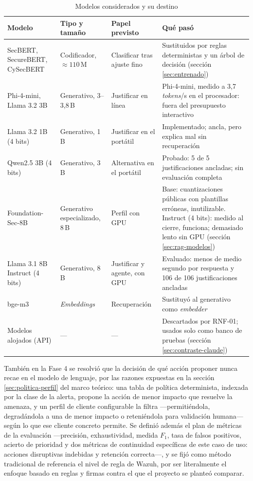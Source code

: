 \begin{table}[H]
  \centering
  \caption{Modelos considerados y su destino}
  \label{tab:candidatos}
  \begin{tabular}{@{}p{}p{}p{}p{}@{}}
    \toprule
    \textbf{Modelo} & \textbf{Tipo y tamaño} & \textbf{Papel previsto} & \textbf{Qué pasó} \\
    \midrule
    SecBERT, SecureBERT, CySecBERT & Codificador, $\approx 110$\,M & Clasificar tras ajuste fino & Sustituidos por reglas deterministas y un árbol de decisión (sección \ref{sec:entrenado}) \\
    Phi-4-mini, Llama 3.2 3B & Generativo, 3--3,8\,B & Justificar en línea & Phi-4-mini, medido a 3,7 \emph{tokens}/s en el procesador: fuera del presupuesto interactivo \\
    Llama 3.2 1B (4 bits) & Generativo, 1\,B & Justificar en el portátil & Implementado; ancla, pero explica mal sin recuperación \\
    Qwen2.5 3B (4 bits) & Generativo, 3\,B & Alternativa en el portátil & Probado: 5 de 5 justificaciones ancladas; sin evaluación completa \\
    Foundation-Sec-8B & Generativo especializado, 8\,B & Perfil con GPU & Base: cuantizaciones públicas con plantillas erróneas, inutilizable. Instruct (4 bits): medido al cierre, funciona; demasiado lento sin GPU (sección \ref{sec:rag-modelos}) \\
    Llama 3.1 8B Instruct (4 bits) & Generativo, 8\,B & Justificar y agente, con GPU & Evaluado: menos de medio segundo por respuesta y 106 de 106 justificaciones ancladas \\
    bge-m3 & \emph{Embeddings} & Recuperación & Sustituyó al generativo como \emph{embedder} \\
    Modelos alojados (API) & --- & --- & Descartados por RNF-01; usados solo como banco de pruebas (sección \ref{sec:contraste-claude}) \\
    \bottomrule
  \end{tabular}
\end{table}

También en la Fase 4 se resolvió que la decisión de qué acción proponer nunca recae en el modelo de
lenguaje, por las razones expuestas en la sección \ref{sec:politica-perfil} del marco teórico: una
tabla de política determinista, indexada por la clase de la alerta, propone la acción de menor
impacto que resuelve la amenaza, y un perfil de cliente configurable la filtra ---permitiéndola,
degradándola a una de menor impacto o reteniéndola para validación humana--- según lo que ese cliente
concreto permite. Se definió además el plan de métricas de la evaluación ---precisión, exhaustividad,
medida $F_1$, tasa de falsos positivos, acierto de prioridad y dos métricas de continuidad
específicas de este caso de uso: acciones disruptivas indebidas y retención correcta---, y se fijó
como método tradicional de referencia el nivel de regla de Wazuh, por ser literalmente el enfoque
basado en reglas y firmas contra el que el proyecto se planteó comparar.

